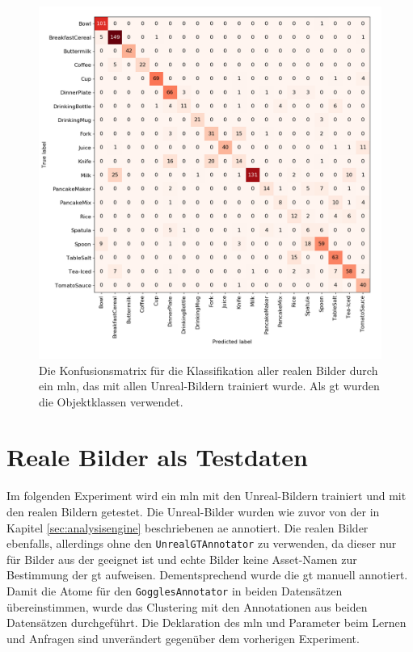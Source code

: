 \begin{figure}
\centering
	\includegraphics[scale=.315]{img/chapter6/UnrealRealGTClass.png}
\caption[Konfusionsmatrix der Objektklassen Klassifikation mit Unreal-Trainingsset und realem Testset]{Die Konfusionsmatrix für die Klassifikation aller realen Bilder durch ein \gls{mln}, das mit allen Unreal-Bildern trainiert wurde. Als \gls{gt} wurden die Objektklassen verwendet.}
\label{fig:UnrealRealGTClass_confMatrix}
\end{figure}  

\section{Reale Bilder als Testdaten}

Im folgenden Experiment wird ein \gls{mln} mit den Unreal-Bildern trainiert und mit den realen Bildern getestet. Die Unreal-Bilder wurden wie zuvor von der in Kapitel \ref{sec:analysisengine} beschriebenen \gls{ae} annotiert. Die realen Bilder ebenfalls, allerdings ohne den \texttt{UnrealGTAnnotator} zu verwenden, da dieser nur für Bilder aus der \unreal geeignet ist und echte Bilder keine Asset-Namen zur Bestimmung der \gls{gt} aufweisen. Dementsprechend wurde die \gls{gt} manuell annotiert. Damit die Atome für den \texttt{GogglesAnnotator} in beiden Datensätzen übereinstimmen, wurde das Clustering mit den Annotationen aus beiden Datensätzen durchgeführt. Die Deklaration des \gls{mln} und Parameter beim Lernen und Anfragen sind unverändert gegenüber dem vorherigen Experiment. \par

